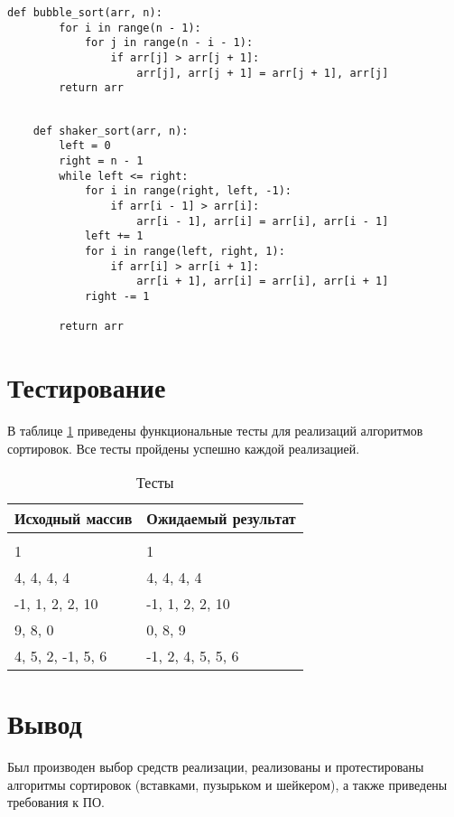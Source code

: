 \begin{lstlisting}[caption=Реализация алгоритма сортировки пузырьком,
	label={bubble_list}]
	def bubble_sort(arr, n):
		for i in range(n - 1):
			for j in range(n - i - 1):
				if arr[j] > arr[j + 1]:
					arr[j], arr[j + 1] = arr[j + 1], arr[j]
		return arr
\end{lstlisting}

\begin{lstlisting}[caption=Реализация алгоритма шейкерной сортировки,
	label={shaker_list}]

	def shaker_sort(arr, n):
		left = 0
		right = n - 1
		while left <= right:
			for i in range(right, left, -1):
				if arr[i - 1] > arr[i]:
					arr[i - 1], arr[i] = arr[i], arr[i - 1]
			left += 1
			for i in range(left, right, 1):
				if arr[i] > arr[i + 1]:
					arr[i + 1], arr[i] = arr[i], arr[i + 1]
			right -= 1
		
		return arr
\end{lstlisting}

\section{Тестирование}

В таблице \ref{test} приведены функциональные тесты для реализаций алгоритмов сортировок. Все тесты пройдены успешно каждой реализацией.

\begin{table}[h]
	\begin{center}
		\caption{\label{test} Тесты}
\begin{tabular}{ | l | l | }
	\hline
	Исходный массив & Ожидаемый результат \\ \hline
	 &  \\
	1 & 1 \\
	4, 4, 4, 4 & 4, 4, 4, 4 \\
	-1, 1, 2, 2, 10 & -1, 1, 2, 2, 10 \\
	9, 8, 0 & 0, 8, 9 \\
	4, 5, 2, -1, 5, 6 & -1, 2, 4, 5, 5, 6 \\
	\hline
\end{tabular}
	\end{center}
\end{table}


\section*{Вывод}

Был производен выбор средств реализации, реализованы и протестированы алгоритмы сортировок (вставками, пузырьком и шейкером), а также приведены требования к ПО.
